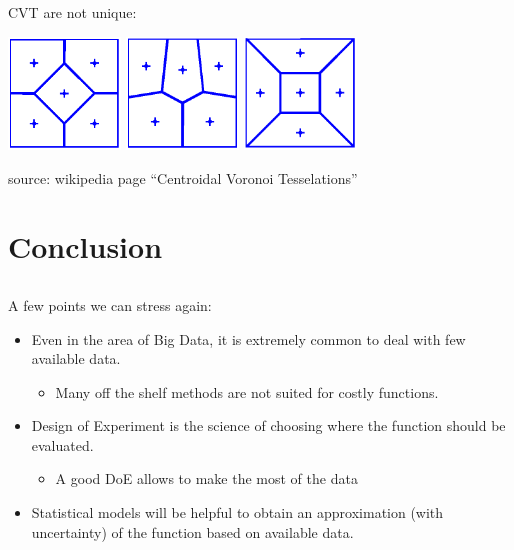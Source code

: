 \documentclass{beamer}
\begin{document}
\begin{frame}{}
CVT are not unique:
\begin{center}
\includegraphics[height=3cm]{figures/CVT1} \qquad
\includegraphics[height=3cm]{figures/CVT2} \qquad
\includegraphics[height=3cm]{figures/CVT3}
\end{center}
 source: wikipedia page ``Centroidal Voronoi Tesselations''
\end{frame}

\section{Conclusion}
\subsection{}

\begin{frame}{}
A few points we can stress again:
\vspace{3mm}
\begin{itemize}
    \setlength\itemsep{3mm} 
    \item Even in the area of Big Data, it is extremely common to deal with few available data.
    \begin{itemize}
        \item Many off the shelf methods are not suited for costly functions.
    \end{itemize}
    \item Design of Experiment is the science of choosing where the function should be evaluated.
    \begin{itemize}
        \item A good DoE allows to make the most of the data
    \end{itemize}
\item Statistical models will be helpful to obtain an approximation (with uncertainty) of the function based on available data.
\end{itemize}
\end{frame}
\end{document}
